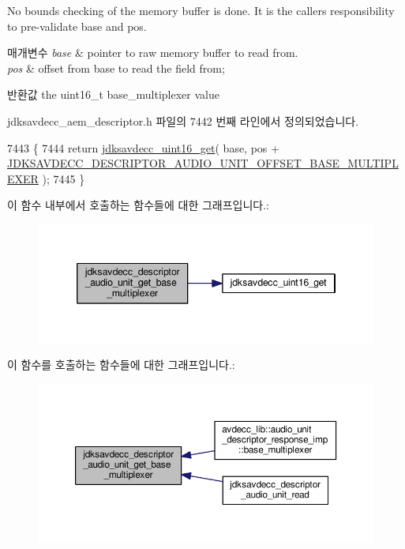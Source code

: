No bounds checking of the memory buffer is done. It is the caller\textquotesingle{}s responsibility to pre-\/validate base and pos.


\begin{DoxyParams}{매개변수}
{\em base} & pointer to raw memory buffer to read from. \\
\hline
{\em pos} & offset from base to read the field from; \\
\hline
\end{DoxyParams}
\begin{DoxyReturn}{반환값}
the uint16\+\_\+t base\+\_\+multiplexer value 
\end{DoxyReturn}


jdksavdecc\+\_\+aem\+\_\+descriptor.\+h 파일의 7442 번째 라인에서 정의되었습니다.


\begin{DoxyCode}
7443 \{
7444     \textcolor{keywordflow}{return} \hyperlink{group__endian_ga3fbbbc20be954aa61e039872965b0dc9}{jdksavdecc\_uint16\_get}( base, pos + 
      \hyperlink{group__descriptor__audio_ga09d7d0552ef89b2a348419a712bb7ad4}{JDKSAVDECC\_DESCRIPTOR\_AUDIO\_UNIT\_OFFSET\_BASE\_MULTIPLEXER}
       );
7445 \}
\end{DoxyCode}


이 함수 내부에서 호출하는 함수들에 대한 그래프입니다.\+:
\nopagebreak
\begin{figure}[H]
\begin{center}
\leavevmode
\includegraphics[width=346pt]{group__descriptor__audio_ga2717be054162a54c60af428f076b6845_cgraph}
\end{center}
\end{figure}




이 함수를 호출하는 함수들에 대한 그래프입니다.\+:
\nopagebreak
\begin{figure}[H]
\begin{center}
\leavevmode
\includegraphics[width=350pt]{group__descriptor__audio_ga2717be054162a54c60af428f076b6845_icgraph}
\end{center}
\end{figure}


